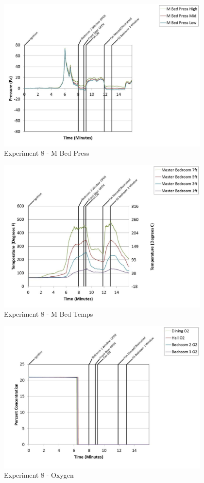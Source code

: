 \documentclass{article}
\begin{document}
\begin{appendices}
	\begin{figure}[h!]
		\centering
		\includegraphics[height=3.05in]{0_Images/Results_Charts/Exp_8_Charts/MBedPress.pdf}
		\caption{Experiment 8 - M Bed Press}
	\end{figure}
 
	\clearpage

	\begin{figure}[h!]
		\centering
		\includegraphics[height=3.05in]{0_Images/Results_Charts/Exp_8_Charts/MBedTemps.pdf}
		\caption{Experiment 8 - M Bed Temps}
	\end{figure}
 

	\begin{figure}[h!]
		\centering
		\includegraphics[height=3.05in]{0_Images/Results_Charts/Exp_8_Charts/Oxygen.pdf}
		\caption{Experiment 8 - Oxygen}
	\end{figure}
 

\end{appendices}
\end{document}
